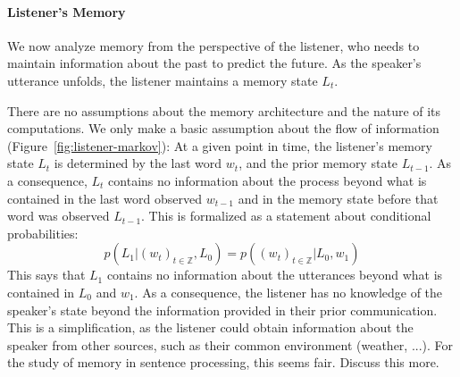 \paragraph{Listener's Memory}
We now analyze memory from the perspective of the listener, who needs to maintain information about the past to predict the future.
As the speaker's utterance unfolds, the listener maintains a memory state $L_t$.



There are no assumptions about the memory architecture and the nature of its computations.
We only make a basic assumption about the flow of information (Figure~\ref{fig:listener-markov}):
At a given point in time, the listener's memory state $L_t$ is determined by the last word $w_t$, and the prior memory state $L_{t-1}$.
As a consequence, $L_t$ contains no information about the process beyond what is contained in the last word observed $w_{t-1}$ and in the memory state before that word was observed $L_{t-1}$.
This is formalized as a statement about conditional probabilities:
	\begin{equation}\label{eq:listener-markov}
		p(L_1| (w_{t})_{t \in \mathbb{Z}}, L_0)   = p((w_{t})_{t \in \mathbb{Z}} | L_0, w_1)
	\end{equation}
This says that $L_1$ contains no information about the utterances beyond what is contained in $L_0$ and $w_1$.	
As a consequence, the listener has no knowledge of the speaker's state beyond the information provided in their prior communication.
This is a simplification, as the listener could obtain information about the speaker from other sources, such as their common environment (weather, ...).
For the study of memory in sentence processing, this seems fair. Discuss this more.

%
%

